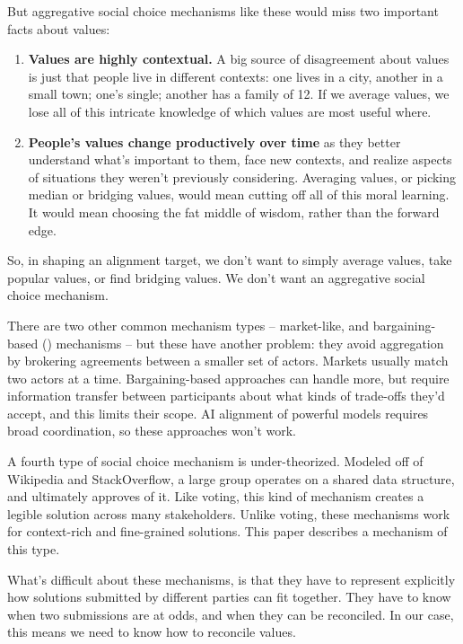 \documentclass{article}
\theoremstyle{definition}
\begin{document}
But aggregative social choice mechanisms like these would miss two important facts about values:
\begin{enumerate}
\item \textbf{Values are highly contextual.} A big source of disagreement about values is just that people live in different contexts: one lives in a city, another in a small town; one's single; another has a family of 12. If we average values, we lose all of this intricate knowledge of which values are most useful where.
\item \textbf{People's values change productively over time} as they better understand what's important to them, face new contexts, and realize aspects of situations they weren't previously considering. Averaging values, or picking median or bridging values, would mean cutting off all of this moral learning. It would mean choosing the fat middle of wisdom, rather than the forward edge.
\end{enumerate}

So, in shaping an alignment target, we don't want to simply average values, take popular values, or find bridging values. We don't want an aggregative social choice mechanism. 

There are two other common mechanism types -- market-like, and bargaining-based (\cite{HOWARD1992142}) mechanisms -- but these have another problem: they avoid aggregation by brokering agreements between a smaller set of actors. Markets usually match two actors at a time. Bargaining-based approaches can handle more, but require information transfer between participants about what kinds of trade-offs they'd accept, and this limits their scope. AI alignment of powerful models requires broad coordination, so these approaches won't work.

A fourth type of social choice mechanism is under-theorized. Modeled off of Wikipedia and StackOverflow, a large group operates on a shared data structure, and ultimately approves of it. Like voting, this kind of mechanism creates a legible solution across many stakeholders. Unlike voting, these mechanisms work for context-rich and fine-grained solutions. This paper describes a mechanism of this type.

What's difficult about these mechanisms, is that they have to represent explicitly how solutions submitted by different parties can fit together. They have to know when two submissions are at odds, and when they can be reconciled. In our case, this means we need to know how to reconcile values. 
\end{document}
